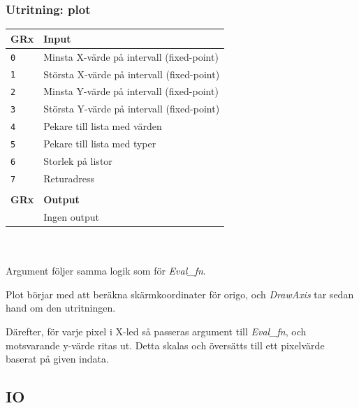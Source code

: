 \documentclass[]{article}
\begin{document}
\subsubsection{Utritning: plot}
\begin{tabular}{ll}
	\textbf{GRx} & \textbf{Input}               \\ \hline
	\texttt{0}   & Minsta X-värde på intervall (fixed-point)  \\
	\texttt{1}   & Största X-värde på intervall (fixed-point) \\
	\texttt{2}   & Minsta Y-värde på intervall (fixed-point)  \\
	\texttt{3}   & Största Y-värde på intervall (fixed-point) \\
	\texttt{4}   & Pekare till lista med värden \\
	\texttt{5}   & Pekare till lista med typer  \\
	\texttt{6}   & Storlek på listor            \\
	\texttt{7}   & Returadress                  \\
	             &  \\
	\textbf{GRx} & \textbf{Output}              \\ \hline
	             & Ingen output
\end{tabular}
\\\\
\noindent
Argument följer samma logik som för \textit{Eval\_fn}.

Plot börjar med att beräkna skärmkoordinater för origo, och \textit{DrawAxis} tar sedan hand om den utritningen.

Därefter, för varje pixel i X-led så passeras argument till \textit{Eval\_fn}, och motsvarande y-värde ritas ut. Detta skalas och översätts till ett pixelvärde baserat på given indata.

\subsection{IO}
\end{document}
